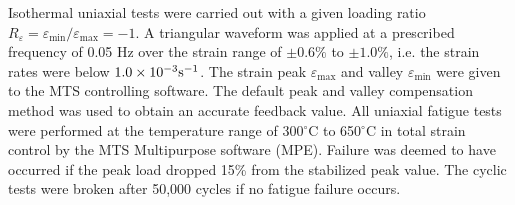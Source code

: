 \documentclass[preprint,5p,twocolumn,11pt,sort&compress]{elsarticle}
\begin{document}
Isothermal uniaxial tests were carried out with a given loading ratio $R_{\varepsilon}=\varepsilon_{\min}/\varepsilon_{\max}=-1$.
A triangular waveform was applied at a prescribed frequency of 0.05 Hz over the strain range of $\pm 0.6\%$ to $\pm 1.0\%$, i.e. the strain rates were below $1.0\times 10^{-3}\rm{s}^{-1}$.
The strain peak  $\varepsilon_{\max}$ and valley $\varepsilon_{\min}$ were given to the MTS controlling software.
The default peak and valley compensation method was used to obtain an accurate feedback value.
All uniaxial fatigue tests were performed at the temperature range of 300$^{\circ}$C to 650$^{\circ}$C in total strain control by the MTS Multipurpose software (MPE).
Failure was deemed to have occurred if the peak load dropped 15\% from the stabilized peak value. The cyclic tests were broken after 50,000 cycles if no fatigue failure occurs.

\end{document}
